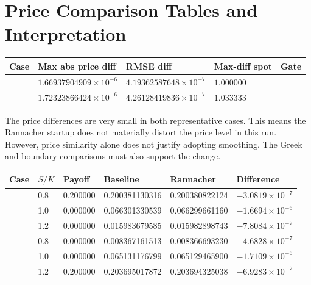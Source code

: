 \documentclass[11pt,a4paper]{article}
\begin{document}
\section{Price Comparison Tables and Interpretation}

\begin{longtable}{P{0.24\textwidth}P{0.14\textwidth}P{0.14\textwidth}P{0.14\textwidth}P{0.16\textwidth}}
\toprule
Case & Max abs price diff & RMSE diff & Max-diff spot & Gate \\
\midrule
\endhead
{} & \(1.66937904909\times 10^{-6}\) & \(4.19362587648\times 10^{-7}\) & \(1.000000\) &  \\
 & \(1.72323866424\times 10^{-6}\) & \(4.26128419836\times 10^{-7}\) & \(1.033333\) &  \\
\bottomrule
\end{longtable}

The price differences are very small in both representative cases. This means the Rannacher
startup does not materially distort the price level in this run. However, price similarity alone
does not justify adopting smoothing. The Greek and boundary comparisons must also support the
change.

\begin{longtable}{P{0.24\textwidth}P{0.12\textwidth}P{0.12\textwidth}P{0.14\textwidth}P{0.14\textwidth}P{0.14\textwidth}}
\toprule
Case & \(S/K\) & Payoff & Baseline & Rannacher & Difference \\
\midrule
\endhead
{} & 0.8 & 0.200000 & 0.200381130316 & 0.200380822124 & \(-3.0819\times10^{-7}\) \\
 & 1.0 & 0.000000 & 0.066301330539 & 0.066299661160 & \(-1.6694\times10^{-6}\) \\
 & 1.2 & 0.000000 & 0.015983679585 & 0.015982898743 & \(-7.8084\times10^{-7}\) \\
 & 0.8 & 0.000000 & 0.008367161513 & 0.008366693230 & \(-4.6828\times10^{-7}\) \\
 & 1.0 & 0.000000 & 0.065131176799 & 0.065129465900 & \(-1.7109\times10^{-6}\) \\
 & 1.2 & 0.200000 & 0.203695017872 & 0.203694325038 & \(-6.9283\times10^{-7}\) \\
\bottomrule
\end{longtable}
\end{document}
